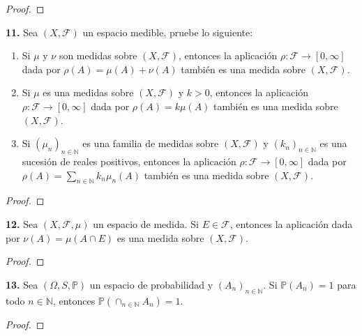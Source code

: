 \documentclass{article}
\newenvironment{statement}[1]{\smallskip\noindent\color[rgb]{1.00,0.00,0.50} {\bf #1.}}{}
\theoremstyle{definition}
\theoremstyle{remark}
\newcommand{\BN}{\mathbb N}
\begin{document}
\begin{proof}
\end{proof}

\begin{statement}{11}
  Sea $(X, \mathcal{F})$ un espacio medible, pruebe lo siguiente:
  \begin{enumerate}
    \item Si $\mu$ y $\nu$ son medidas sobre $(X, \mathcal{F})$, entonces la aplicaci\'on $\rho: \mathcal{F} \to [0, \infty]$ dada por $\rho(A) = \mu(A) + \nu(A)$ tambi\'en es una medida sobre $(X, \mathcal{F})$.
    \item Si $\mu$ es una medidas sobre $(X, \mathcal{F})$ y $k > 0$, entonces la aplicaci\'on $\rho: \mathcal{F} \to [0, \infty]$ dada por $\rho(A) = k \mu(A)$ tambi\'en es una medida sobre $(X, \mathcal{F})$.
    \item Si $(\mu_n)_{n \in \BN}$ es una familia de medidas sobre $(X, \mathcal{F})$ y $(k_n)_{n \in \BN}$ es una sucesi\'on de reales positivos, entonces la aplicaci\'on $\rho: \mathcal{F} \to [0, \infty]$ dada por $\rho(A) = \sum_{n \in \BN} k_n \mu_n(A)$ tambi\'en es una medida sobre $(X, \mathcal{F})$.
  \end{enumerate}
\end{statement}

\begin{proof}
\end{proof}

\begin{statement}{12}
  Sea $(X, \mathcal{F}, \mu)$ un espacio de medida. Si $E \in \mathcal{F}$, entonces la aplicaci\'on dada por $\nu(A) = \mu(A \cap E)$ es una medida sobre $(X, \mathcal{F})$.
\end{statement}

\begin{proof}
\end{proof}

\begin{statement}{13}
  Sea $(\Omega, S, \mathbb{P})$ un espacio de probabilidad y $(A_n)_{n \in \BN}$. Si $\mathbb{P}(A_n) = 1$ para todo $n \in \BN$, entonces $\mathbb{P}(\cap_{n \in \BN} A_n) = 1$.
\end{statement}

\begin{proof}
\end{proof}
\end{document}
